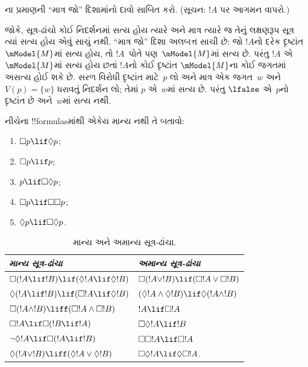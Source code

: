 \documentclass[../../../include/open-logic-section]{subfiles}
\begin{document}
\begin{prob}
  ના પ્રમાણની
  ``માત્ર જો'' દિશામાંનો દાવો સાબિત કરો. (સૂચન:
  $!A$ પર આગમન વાપરો.)
\end{prob}

જોકે, સૂત્ર-ઢાંચો કોઈ નિદર્શનમાં સત્ય હોય ત્યારે
અને માત્ર ત્યારે જ તેનું લક્ષણરૂપ સૂત્ર ત્યાં સત્ય
હોય એવું સાચું નથી. ``માત્ર જો'' દિશા અલબત્ત સાચી છે:
જો $!A$નો દરેક દૃષ્ટાંત~$\mModel{M}$માં સત્ય હોય,
તો $!A$~પોતે પણ~$\mModel{M}$માં સત્ય છે. પરંતુ
$!A$ એ~$\mModel{M}$માં સત્ય હોય છતાં $!A$નો કોઈ દૃષ્ટાંત
$\mModel{M}$ના કોઈ જગતમાં અસત્ય હોઈ શકે છે. સરળ
વિરોધી દૃષ્ટાંત માટે~$p$ લો અને માત્ર એક જગત~$w$ અને
$V(p) = \{w\}$ ધરાવતું નિદર્શન લો; તેમાં $p$
એ~$w$માં સત્ય છે. પરંતુ $\lfalse$ એ~$p$નો
દૃષ્ટાંત છે અને~$w$માં સત્ય નથી.

\begin{prob}
  નીચેના !!{formula}sમાંથી એકેય માન્ય નથી તે બતાવો:
  \begin{enumerate}
    \item[\Ax{D}:] \quad $\Box p \lif \Diamond p$;
    \item[\Ax{T}:] \quad $\Box p \lif p$;
    \item[\Ax{B}:] \quad $p \lif \Box\Diamond p$;
    \item[\Ax{4}:] \quad $\Box p \lif \Box \Box p$;
    \item[\Ax{5}:] \quad $\Diamond p \lif \Box \Diamond
      p$.
  \end{enumerate}
\end{prob}

\begin{table}[t]
    \centering
    \begin{tabular}{| l || l |}
      \hline
      {\emph{માન્ય સૂત્ર-ઢાંચા}} & {\emph{અમાન્ય સૂત્ર-ઢાંચા}} \\
      \hline\hline
      $\Box(!A \lif !B) \lif (\Diamond !A \lif \Diamond !B)$
      & $\Box (!A \lor !B) \lif (\Box !A \lor \Box !B)$ \\
      $\Diamond (!A \lif !B) \lif (\Box !A \lif \Diamond
      !B)$
      & $(\Diamond !A \land \Diamond !B) \lif \Diamond (!A
      \land !B)$\\
      $\Box (!A \land !B) \liff (\Box !A \land \Box !B)$
      & $!A \lif \Box !A$ \\
      $\Box !A \lif \Box (!B \lif !A)$
      & $\Box \Diamond !A \lif !B$ \\
      $\lnot \Diamond !A \lif \Box (!A \lif !B)$
      & $\Box \Box !A \lif \Box !A$ \\
      $\Diamond (!A \lor !B) \liff (\Diamond !A \lor
      \Diamond !B)$
      & $\Box \Diamond !A \lif \Diamond \Box !A$. \\
      \hline
    \end{tabular}
    \caption{માન્ય અને અમાન્ય સૂત્ર-ઢાંચા.}
\end{table}
\end{document}
